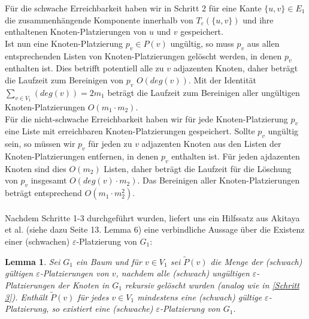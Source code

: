 \documentclass[a4paper, 12pt, twoside]{article}
\theoremstyle{Format1} %
\newtheorem{Lem}[Def]{Lemma}                %
\begin{document}
Für die schwache Erreichbarkeit haben wir in Schritt 2 für eine Kante $\{u,v\} \in E_1$ die zusammenhängende Komponente innerhalb von $T_{\varepsilon}(\{u,v\})$
und ihre enthaltenen Knoten-Platzierungen von $u$ und $v$ gespeichert.
\\
Ist nun eine Knoten-Platzierung $p_v \in P(v)$ ungültig, so muss $p_v$ aus allen entsprechenden Listen von Knoten-Platzierungen gelöscht werden, in
denen $p_v$ enthalten ist. Dies betrifft potentiell alle zu $v$ adjazenten Knoten, daher beträgt die Laufzeit zum Bereinigen von $p_v$ $O(deg(v))$.
Mit der Identität $\sum_{v \in V_1}(deg(v)) = 2m_1$ beträgt die Laufzeit zum Bereinigen aller ungültigen Knoten-Platzierungen $O(m_1 \cdot m_2)$.
\\
Für die nicht-schwache Erreichbarkeit haben wir für jede Knoten-Platzierung $p_v$ eine Liste mit erreichbaren Knoten-Platzierungen gespeichert.
Sollte $p_v$ ungültig sein, so müssen wir $p_v$ für jeden zu $v$ adjazenten Knoten aus den Listen der Knoten-Platzierungen entfernen, in denen $p_v$ enthalten ist.
Für jeden ajdazenten Knoten sind dies $O(m_2)$ Listen, daher beträgt die Laufzeit für die Löschung von $p_v$ insgesamt $O(deg(v) \cdot m_2)$.
Das Bereinigen aller Knoten-Platzierungen beträgt entsprechend $O(m_1 \cdot m_2^2)$.
\\
\\
Nachdem Schritte 1-3 durchgeführt wurden, liefert uns ein Hilfssatz aus Akitaya et al. (siehe dazu Seite 13. Lemma 6) eine verbindliche Aussage über die Existenz
einer (schwachen) $\varepsilon$-Platzierung von $G_1$:

\begin{Lem} \label {Lemma 1}
	Sei $G_1$ ein Baum und für $v \in V_1$ sei $\tilde{P}(v)$ die Menge der (schwach) gültigen $\varepsilon$-Platzierungen von $v$, nachdem
	alle (schwach) ungültigen $\varepsilon$-Platzierungen der Knoten in $G_1$ rekursiv gelöscht wurden (analog wie in \ref{Schritt 3}).
	Enthält $\tilde{P}(v)$ für jedes $v \in V_1$ mindestens eine (schwach) gültige $\varepsilon$-Platzierung, so existiert
	eine (schwache) $\varepsilon$-Platzierung von $G_1$.
\end{Lem}
\end{document}
